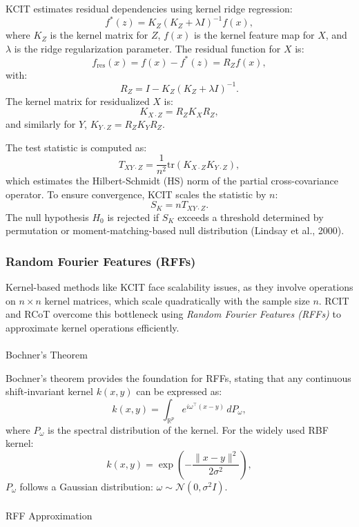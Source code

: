 \documentclass[
]{article}
\makeatletter
\let\oldparagraph\paragraph
\renewcommand{\paragraph}{
    \@ifstar
      \xxxParagraphStar
      \xxxParagraphNoStar
  }
\newcommand{\xxxParagraphStar}[1]{\oldparagraph*{#1}\mbox{}}
\newcommand{\xxxParagraphNoStar}[1]{\oldparagraph{#1}\mbox{}}
\makeatother
\begin{document}
KCIT estimates residual dependencies using kernel ridge regression: \[
f^*(z) = K_Z (K_Z + \lambda I)^{-1} f(x),
\] where \(K_Z\) is the kernel matrix for \(Z\), \(f(x)\) is the kernel
feature map for \(X\), and \(\lambda\) is the ridge regularization
parameter. The residual function for \(X\) is: \[
f_\text{res}(x) = f(x) - f^*(z) = R_Z f(x),
\] with: \[
R_Z = I - K_Z (K_Z + \lambda I)^{-1}.
\] The kernel matrix for residualized \(X\) is: \[
K_{X \cdot Z} = R_Z K_X R_Z,
\] and similarly for \(Y\), \(K_{Y \cdot Z} = R_Z K_Y R_Z\).

The test statistic is computed as: \[
T_{XY \cdot Z} = \frac{1}{n^2} \text{tr}(K_{X \cdot Z} K_{Y \cdot Z}),
\] which estimates the Hilbert-Schmidt (HS) norm of the partial
cross-covariance operator. To ensure convergence, KCIT scales the
statistic by \(n\): \[
S_K = n T_{XY \cdot Z}.
\] The null hypothesis \(H_0\) is rejected if \(S_K\) exceeds a
threshold determined by permutation or moment-matching-based null
distribution (Lindsay et al., 2000).

\subsubsection{Random Fourier Features
(RFFs)}\label{random-fourier-features-rffs}

Kernel-based methods like KCIT face scalability issues, as they involve
operations on \(n \times n\) kernel matrices, which scale quadratically
with the sample size \(n\). RCIT and RCoT overcome this bottleneck using
\emph{Random Fourier Features (RFFs)} to approximate kernel operations
efficiently.

\paragraph{Bochner's Theorem}\label{bochners-theorem}

Bochner's theorem provides the foundation for RFFs, stating that any
continuous shift-invariant kernel \(k(x, y)\) can be expressed as: \[
k(x, y) = \int_{\mathbb{R}^p} e^{i \omega^\top (x - y)} \, dP_\omega,
\] where \(P_\omega\) is the spectral distribution of the kernel. For
the widely used RBF kernel: \[
k(x, y) = \exp\left(-\frac{\|x - y\|^2}{2\sigma^2}\right),
\] \(P_\omega\) follows a Gaussian distribution:
\(\omega \sim \mathcal{N}(0, \sigma^2 I)\).

\paragraph{RFF Approximation}\label{rff-approximation}
\end{document}
